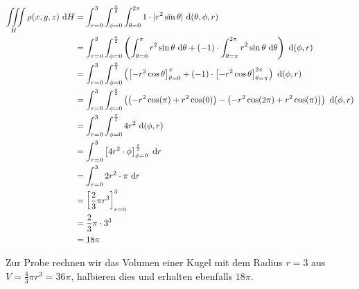 \documentclass[main.tex]{subfiles}
\begin{document}
\begin{align*}
    \iiint \limits_H \rho(x, y, z) ~\mathrm{d}H 
    &=
    \int_{r=0}^{3}
    \int_{\phi=0}^{\frac{\pi}{2}}
    \int_{\theta=0}^{2\pi}
        1 \cdot \lvert r^2\sin\theta\rvert
    ~\mathrm{d}(\theta, \phi, r)\\
    &=
    \int_{r=0}^{3}
    \int_{\phi=0}^{\frac{\pi}{2}}
    \left(
        \int_{\theta=0}^{\pi}
            r^2\sin\theta
        ~\mathrm{d}\theta+ (-1) \cdot
        \int_{\theta=\pi}^{2\pi}
            r^2\sin\theta
        ~\mathrm{d}\theta
    \right)
    ~\mathrm{d}(\phi, r)\\
    &=
    \int_{r=0}^{3}
    \int_{\phi=0}^{\frac{\pi}{2}}
    \left(
        \left[
            - r^2 \cos\theta
        \right]_{\theta=0}^{\pi} 
        + (-1) \cdot
        \left[
            - r^2 \cos\theta
        \right]_{\theta=\pi}^{2\pi}
    \right)
    ~\mathrm{d}(\phi, r)\\
    &=
    \int_{r=0}^{3}
    \int_{\phi=0}^{\frac{\pi}{2}}
    \left(
        \left(
            - r^2 \cos (\pi)
            + r^2 \cos (0)
        \right) 
        -
        \left(
            - r^2 \cos (2\pi)
            + r^2 \cos (\pi)
        \right)
    \right)
    ~\mathrm{d}(\phi, r)\\
    &=
    \int_{r=0}^{3}
    \int_{\phi=0}^{\frac{\pi}{2}}
        4 r^2
    ~\mathrm{d}(\phi, r)\\
    &=
    \int_{r=0}^{3}
    \left[
        4 r^2 \cdot \phi
    \right]_{\phi=0}^{\frac{\pi}{2}}
    ~\mathrm{d}r\\
    &=
    \int_{r=0}^{3}
        2 r^2 \cdot \pi
    ~\mathrm{d}r\\
    &=
    \left[
        \frac{2}{3} \pi r^3
    \right]_{r=0}^{3}\\
    &= \frac{2}{3} \pi\cdot 3^3 \\
    &= 18\pi \\
\end{align*}

Zur Probe rechnen wir das Volumen einer Kugel mit dem Radius $r=3$ aus
$V = \frac{4}{3} \pi r^3 = 36 \pi$, halbieren dies und erhalten ebenfalls $18\pi$. 
\end{document}
